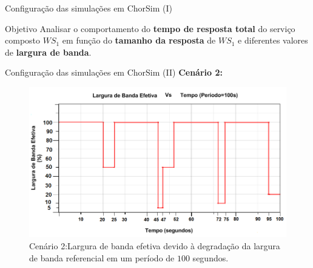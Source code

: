 \documentclass[xcolor=svgnames]{beamer}
\begin{document}
  \begin{frame}{Configuração das simulações em ChorSim (I)}  
      
      \begin{block}{Objetivo} 
      Analisar o comportamento do \textbf{tempo de resposta total} do serviço composto $WS_1$ em função do
      \textbf{tamanho da resposta} de $WS_1$ e diferentes valores de \textbf{largura de banda}.
      \end{block}

      \pause 

    
  \end{frame}

  \begin{frame}{Configuração das simulações em ChorSim (II)}  
	\textbf{Cenário 2:}
  	\begin{figure}[!h]
	    \centering
	    \includegraphics[width=1.0\linewidth]{figures/failure_model.png}
	    \caption{Cenário 2:Largura de banda efetiva devido à degradação da largura de banda referencial em um período de $100$ segundos.}
	    \label{figure:failure_model}
	\end{figure}
  \end{frame}  
\end{document}

